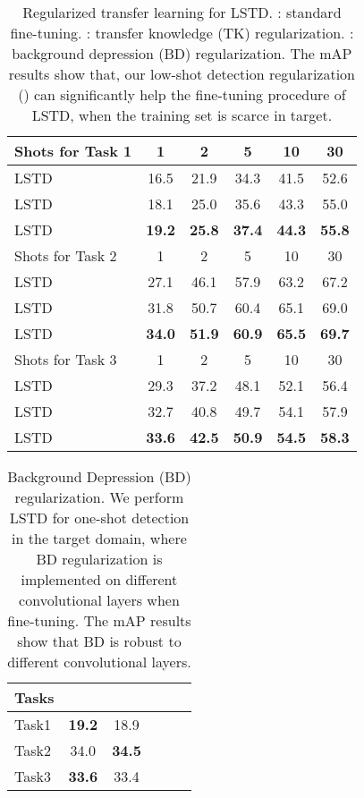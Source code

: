 \documentclass[letterpaper]{article} \usepackage{aaai18}  \usepackage{times}  \usepackage{helvet}  \usepackage{courier}  \usepackage{url}  \usepackage{graphicx}
\begin{document}
\begin{table}[t]
\centering
\begin{tabular}{l|ccccc}
\hline
Shots for Task 1 & 1 & 2 & 5 & 10 & 30  \\
\hline
LSTD &  16.5 & 21.9 & 34.3 & 41.5 & 52.6 \\
LSTD & 18.1 & 25.0 & 35.6 & 43.3 & 55.0 \\
LSTD & \textbf{19.2} & \textbf{25.8} & \textbf{37.4} & \textbf{44.3} & \textbf{55.8} \\
\hline
Shots for Task 2 & 1 & 2 & 5 & 10 & 30  \\
\hline
LSTD& 27.1 & 46.1 & 57.9 & 63.2 & 67.2 \\
LSTD & 31.8 & 50.7 & 60.4 & 65.1 & 69.0 \\
LSTD & \textbf{34.0} & \textbf{51.9} & \textbf{60.9} & \textbf{65.5} & \textbf{69.7} \\
\hline
Shots for Task 3 & 1 & 2 & 5 & 10 & 30  \\
\hline
LSTD& 29.3 & 37.2  & 48.1 & 52.1 & 56.4 \\
LSTD & 32.7 & 40.8 & 49.7 & 54.1 & 57.9 \\
LSTD & \textbf{33.6} & \textbf{42.5} & \textbf{50.9} & \textbf{54.5} & \textbf{58.3} \\
\hline
\end{tabular}
\caption{Regularized transfer learning for LSTD.
: standard fine-tuning.
: transfer knowledge (TK) regularization.
: background depression (BD) regularization.
The mAP results show that,
our low-shot detection regularization () can significantly help the fine-tuning procedure of LSTD,
when the training set is scarce in target.}
\label{LSTDTransfer}
\end{table}


\begin{table}[t]
\centering
\begin{tabular}{l|ccccc}
\hline
Tasks &  &   \\
\hline
Task1 & \textbf{19.2}  & 18.9 \\
Task2 & 34.0  & \textbf{34.5}  \\
Task3 & \textbf{33.6}  & 33.4 \\
\hline
\end{tabular}
\caption{Background Depression (BD) regularization.
We perform LSTD for one-shot detection in the target domain,
where
BD regularization is implemented on different convolutional layers when fine-tuning.
The mAP results show that BD is robust to different convolutional layers.}
\label{BDdiffconv}
\end{table}
\end{document}
